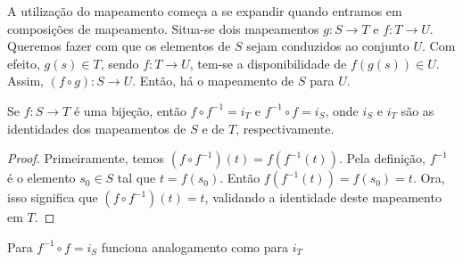 A utilização do mapeamento começa a se expandir quando entramos em composições de mapeamento. Situa-se dois mapeamentos $g:S \to T$ e $f:T \to U$. Queremos fazer com que os elementos de $S$ sejam conduzidos ao conjunto $U$. Com efeito, $g(s) \in T$, sendo $f:T \to U$, tem-se a disponibilidade de $f(g(s)) \in U$. Assim, $(f\circ g):S \to U$. Então, há o mapeamento de $S$ para $U$.
\begin{lemma}
    Se $f:S \to T$ é uma bijeção, então $f\circ f^{-1} = i_{T}$ e $f^{-1} \circ f=i_{S}$, onde $i_{S}$ e $i_{T}$ são as identidades dos mapeamentos de $S$ e de $T$, respectivamente.
    \begin{proof}
        Primeiramente, temos $(f\circ f^{-1})(t)=f(f^{-1}(t))$. Pela definição, $f^{-1}$ é o elemento $s_{0}\in S$ tal que $t=f(s_{0})$. Então $f(f^{-1}(t))=f(s_{0})=t$. Ora, isso significa que $(f\circ f^{-1})(t) = t$, validando a identidade deste mapeamento em $T$.
    \end{proof}
\end{lemma}
Para $f^{-1}\circ f = i_{S}$ funciona analogamento como para $i_{T}$


